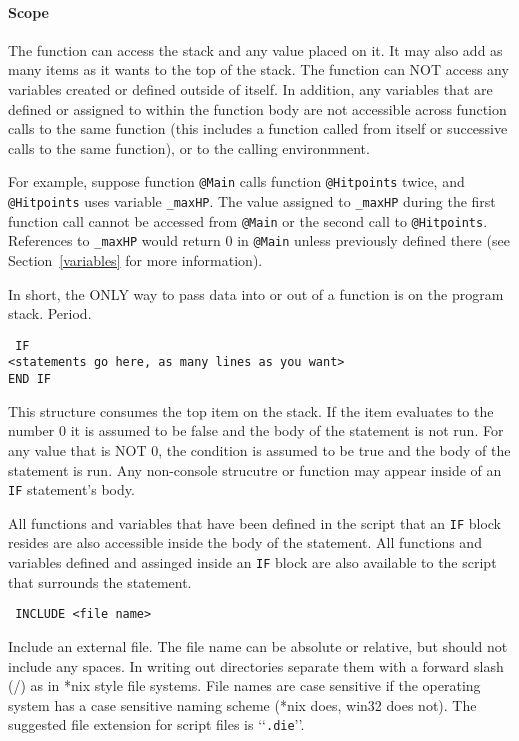 \paragraph*{Scope\\}
\hspace*{\parindent}The function can access the stack and any value placed on
it. It may also
add as many items as it wants to the top of the stack. The function
can NOT access any variables created or defined outside of itself. In addition,
any variables that are defined or assigned to within the function body are not
accessible across function calls to the same function
(this includes a function called from itself or successive calls to the
same function), or to the calling environmnent.

For example, suppose function \texttt{@Main} calls function \texttt{@Hitpoints}
twice, and \texttt{@Hitpoints} uses variable \texttt{\_maxHP}. The value
assigned to \texttt{\_maxHP} during the first function call cannot be accessed
from \texttt{@Main} or the second call to \texttt{@Hitpoints}.
References to \texttt{\_maxHP} would return 0 in \texttt{@Main} unless
previously defined there (see Section~\ref{variables} for more information).

In short, the ONLY way to pass data into or out of a function is on the program
stack. Period.

\breakline

\noindent\texttt{%
IF\\
<statements go here, as many lines as you want>\\
END IF}

This structure consumes the top item on the stack. If the item evaluates to the
number 0 it is assumed to be false and the body of the statement is not run.
For any value that is NOT 0, the condition is assumed to be true and the body
of the statement is run. Any non-console strucutre or function may appear
inside of an \texttt{IF} statement's body.

All functions and variables that have been defined in the script that an
\texttt{IF} block resides are also accessible inside the body of the statement.
All functions and variables defined and assinged inside an \texttt{IF} block
are also available to the script that surrounds the statement.

\breakline

\noindent\texttt{%
INCLUDE <file name>}

Include an external file. The file name can be absolute or relative, but
should not include any spaces. In writing out directories separate them with a
forward slash (/) as in *nix style file systems. File names are case sensitive
if the operating system has a case sensitive naming scheme (*nix does, win32
does not). The suggested file extension for script files is
\lq\lq\texttt{.die}\rq\rq.

